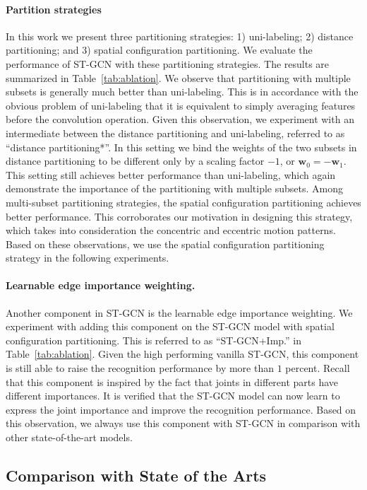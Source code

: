 \documentclass[letterpaper]{article} %
\begin{document}
\paragraph{Partition strategies}
In this work we present three partitioning strategies: 1) uni-labeling; 2) distance partitioning; and 3) spatial configuration partitioning.
We evaluate the performance of ST-GCN with these partitioning strategies.
The results are summarized in Table~\ref{tab:ablation}.
We observe that partitioning with multiple subsets is generally much better than uni-labeling. 
This is in accordance with the obvious problem of uni-labeling that it is equivalent to simply averaging features before the convolution operation.
Given this observation, we experiment with an intermediate between the distance partitioning and uni-labeling, referred to as ``distance partitioning*''.
In this setting we bind the weights of the two subsets in distance partitioning to be different only by a scaling factor $-1$, or $ \mathbf{w}_0 = -\mathbf{w}_1 $.
This setting still achieves better performance than uni-labeling, which again demonstrate the importance of the partitioning with multiple subsets.
Among multi-subset partitioning strategies, the spatial configuration partitioning achieves better performance.
This corroborates our motivation in designing this strategy, which takes into consideration the concentric and eccentric motion patterns.
Based on these observations, we use the spatial configuration partitioning strategy in the following experiments.


\paragraph{Learnable edge importance weighting.}
Another component in ST-GCN is the learnable edge importance weighting. 
We experiment with adding this component on the ST-GCN model with spatial configuration partitioning.
This is referred to as ``ST-GCN+Imp.'' in Table~\ref{tab:ablation}.
Given the high performing vanilla ST-GCN, this component is still able to raise the recognition performance by more than $ 1 $ percent.
Recall that this component is inspired by the fact that joints in different parts have different importances.
It is verified that the ST-GCN model can now learn to express the joint importance and improve the recognition performance.
Based on this observation, we always use this component with ST-GCN in comparison with other state-of-the-art models.


\subsection{Comparison with State of the Arts}
\end{document}
